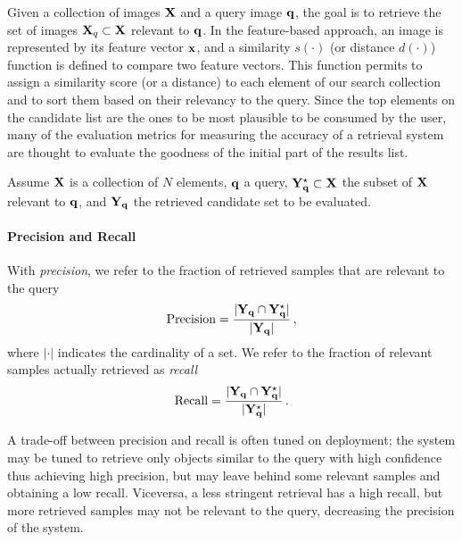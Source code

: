 Given a collection of images $\mathbf{X}$ and a query image $\mathbf{q}$, the goal is to retrieve the set of images $\mathbf{X}_q \subset \mathbf{X}$ relevant to $\mathbf{q}$.
In the feature-based approach, an image is represented by its feature vector $\mathbf{x}$, and a similarity $s(\cdot)$ (or distance $d(\cdot)$) function is defined to compare two feature vectors.
This function permits to assign a similarity score (or a distance) to each element of our search collection and to sort them based on their relevancy to the query.
Since the top elements on the candidate list are the ones to be most plausible to be consumed by the user, many of the evaluation metrics for measuring the accuracy of a retrieval system are thought to evaluate the goodness of the initial part of the results list.

Assume $\mathbf{X}$ %
is a collection of $N$ elements, $\mathbf{q}$ a query, $\mathbf{Y}^{\star}_{\mathbf{q}} \subset \mathbf{X}$ the subset of $\mathbf{X}$ relevant to $\mathbf{q}$, and $\mathbf{Y}_{\mathbf{q}}$ the retrieved candidate set to be evaluated.
\paragraph{Precision and Recall}
With \emph{precision}, we refer to the fraction of retrieved samples that are relevant to the query
\begin{equation} \label{eq:back:precision}
\text{Precision} = \frac{|\mathbf{Y}_{\mathbf{q}} \cap \mathbf{Y}^{\star}_{\mathbf{q}}|}{|\mathbf{Y}_{\mathbf{q}}|} \,,
\end{equation}
where $|\cdot|$ indicates the cardinality of a set.
We refer to the fraction of relevant samples actually retrieved as \emph{recall}
\begin{equation} \label{eq:back:recall}
\text{Recall} = \frac{|\mathbf{Y}_{\mathbf{q}} \cap \mathbf{Y}^{\star}_{\mathbf{q}}|}{|\mathbf{Y}^{\star}_{\mathbf{q}}|} \,.
\end{equation}

A trade-off between precision and recall is often tuned on deployment;
the system may be tuned to retrieve only objects similar to the query with high confidence thus achieving high precision, but may leave behind some relevant samples and obtaining a low recall.
Viceversa, a less stringent retrieval has a high recall, but more retrieved samples may not be relevant to the query, decreasing the precision of the system.

